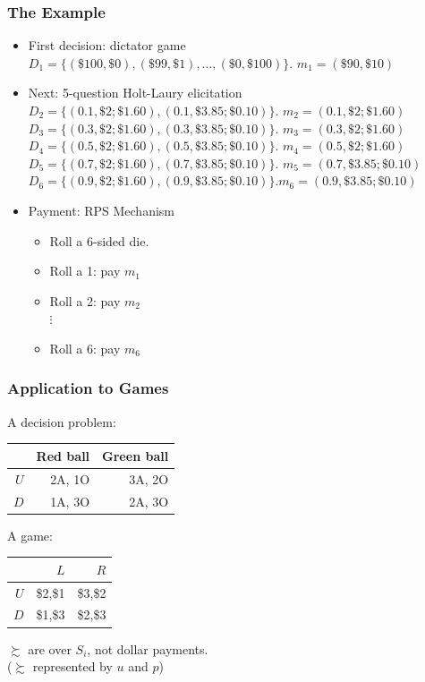 

\begin{frame}
  \frametitle{The Example}
  \begin{itemize}
    \item First decision: dictator game\\
    $D_1 = \{(\$100,\$0),(\$99,\$1),\ldots,(\$0,\$100)\}$. $m_1 = (\$90,\$10)$
    \item Next: 5-question Holt-Laury elicitation\\
    $D_2 = \{(0.1,\$2;\$1.60),(0.1,\$3.85;\$0.10)\}$. $m_2 = (0.1,\$2;\$1.60)$\\
    $D_3 = \{(0.3,\$2;\$1.60),(0.3,\$3.85;\$0.10)\}$. $m_3 = (0.3,\$2;\$1.60)$\\
    $D_4 = \{(0.5,\$2;\$1.60),(0.5,\$3.85;\$0.10)\}$. $m_4 = (0.5,\$2;\$1.60)$\\
    $D_5 = \{(0.7,\$2;\$1.60),(0.7,\$3.85;\$0.10)\}$. $m_5 = (0.7,\$3.85;\$0.10)$\\
    $D_6 = \{(0.9,\$2;\$1.60),(0.9,\$3.85;\$0.10)\}$.$m_6 = (0.9,\$3.85;\$0.10)$
    \item Payment: RPS Mechanism
    \begin{itemize}
      \item Roll a 6-sided die.
      \item Roll a 1: pay $m_1$
      \item Roll a 2: pay $m_2$\\
            $\vdots$
      \item Roll a 6: pay $m_6$
    \end{itemize}
  \end{itemize}
\end{frame}


\begin{frame}
  \frametitle{Application to Games}
  \begin{center}
  A decision problem:\\
    \begin{tabular}{|r|r|r|}
\hline
  & Red ball & Green ball   \\
\hline
$U$ & 2A, 1O & 3A, 2O  \\
\hline
$D$ & 1A, 3O  & 2A, 3O \\
\hline

\end{tabular}
\br
A game:\\
\begin{tabular}{|r|r|r|}
\hline
  & $L$ & $R$   \\
\hline
$U$ & \$2,\$1 & \$3,\$2  \\
\hline
$D$ & \$1,\$3 & \$2,\$3 \\
\hline

\end{tabular}
  \end{center}
\br
$\succsim$ are over $S_i$, not dollar payments.\\
($\succsim$ represented by $u$ and $p$)
\end{frame}


